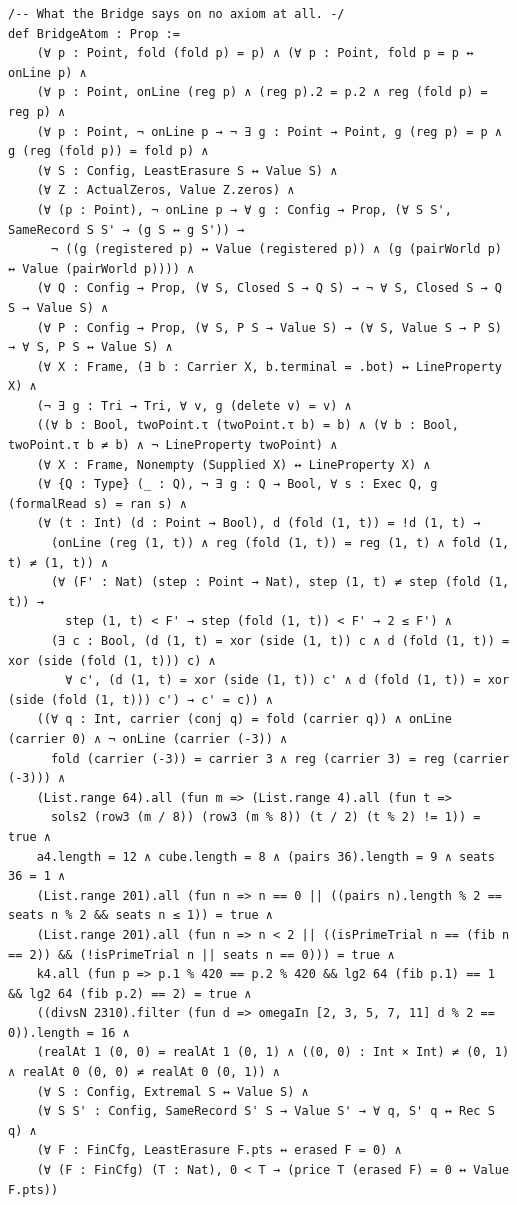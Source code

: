 \documentclass[10pt,twocolumn]{article}
\begin{document}
\begin{Verbatim}
/-- What the Bridge says on no axiom at all. -/
def BridgeAtom : Prop :=
    (∀ p : Point, fold (fold p) = p) ∧ (∀ p : Point, fold p = p ↔ onLine p) ∧
    (∀ p : Point, onLine (reg p) ∧ (reg p).2 = p.2 ∧ reg (fold p) = reg p) ∧
    (∀ p : Point, ¬ onLine p → ¬ ∃ g : Point → Point, g (reg p) = p ∧ g (reg (fold p)) = fold p) ∧
    (∀ S : Config, LeastErasure S ↔ Value S) ∧
    (∀ Z : ActualZeros, Value Z.zeros) ∧
    (∀ (p : Point), ¬ onLine p → ∀ g : Config → Prop, (∀ S S', SameRecord S S' → (g S ↔ g S')) →
      ¬ ((g (registered p) ↔ Value (registered p)) ∧ (g (pairWorld p) ↔ Value (pairWorld p)))) ∧
    (∀ Q : Config → Prop, (∀ S, Closed S → Q S) → ¬ ∀ S, Closed S → Q S → Value S) ∧
    (∀ P : Config → Prop, (∀ S, P S → Value S) → (∀ S, Value S → P S) → ∀ S, P S ↔ Value S) ∧
    (∀ X : Frame, (∃ b : Carrier X, b.terminal = .bot) ↔ LineProperty X) ∧
    (¬ ∃ g : Tri → Tri, ∀ v, g (delete v) = v) ∧
    ((∀ b : Bool, twoPoint.τ (twoPoint.τ b) = b) ∧ (∀ b : Bool, twoPoint.τ b ≠ b) ∧ ¬ LineProperty twoPoint) ∧
    (∀ X : Frame, Nonempty (Supplied X) ↔ LineProperty X) ∧
    (∀ {Q : Type} (_ : Q), ¬ ∃ g : Q → Bool, ∀ s : Exec Q, g (formalRead s) = ran s) ∧
    (∀ (t : Int) (d : Point → Bool), d (fold (1, t)) = !d (1, t) →
      (onLine (reg (1, t)) ∧ reg (fold (1, t)) = reg (1, t) ∧ fold (1, t) ≠ (1, t)) ∧
      (∀ (F' : Nat) (step : Point → Nat), step (1, t) ≠ step (fold (1, t)) →
        step (1, t) < F' → step (fold (1, t)) < F' → 2 ≤ F') ∧
      (∃ c : Bool, (d (1, t) = xor (side (1, t)) c ∧ d (fold (1, t)) = xor (side (fold (1, t))) c) ∧
        ∀ c', (d (1, t) = xor (side (1, t)) c' ∧ d (fold (1, t)) = xor (side (fold (1, t))) c') → c' = c)) ∧
    ((∀ q : Int, carrier (conj q) = fold (carrier q)) ∧ onLine (carrier 0) ∧ ¬ onLine (carrier (-3)) ∧
      fold (carrier (-3)) = carrier 3 ∧ reg (carrier 3) = reg (carrier (-3))) ∧
    (List.range 64).all (fun m => (List.range 4).all (fun t =>
      sols2 (row3 (m / 8)) (row3 (m % 8)) (t / 2) (t % 2) != 1)) = true ∧
    a4.length = 12 ∧ cube.length = 8 ∧ (pairs 36).length = 9 ∧ seats 36 = 1 ∧
    (List.range 201).all (fun n => n == 0 || ((pairs n).length % 2 == seats n % 2 && seats n ≤ 1)) = true ∧
    (List.range 201).all (fun n => n < 2 || ((isPrimeTrial n == (fib n == 2)) && (!isPrimeTrial n || seats n == 0))) = true ∧
    k4.all (fun p => p.1 % 420 == p.2 % 420 && lg2 64 (fib p.1) == 1 && lg2 64 (fib p.2) == 2) = true ∧
    ((divsN 2310).filter (fun d => omegaIn [2, 3, 5, 7, 11] d % 2 == 0)).length = 16 ∧
    (realAt 1 (0, 0) = realAt 1 (0, 1) ∧ ((0, 0) : Int × Int) ≠ (0, 1) ∧ realAt 0 (0, 0) ≠ realAt 0 (0, 1)) ∧
    (∀ S : Config, Extremal S ↔ Value S) ∧
    (∀ S S' : Config, SameRecord S' S → Value S' → ∀ q, S' q ↔ Rec S q) ∧
    (∀ F : FinCfg, LeastErasure F.pts ↔ erased F = 0) ∧
    (∀ (F : FinCfg) (T : Nat), 0 < T → (price T (erased F) = 0 ↔ Value F.pts))


\end{Verbatim}
\end{document}
